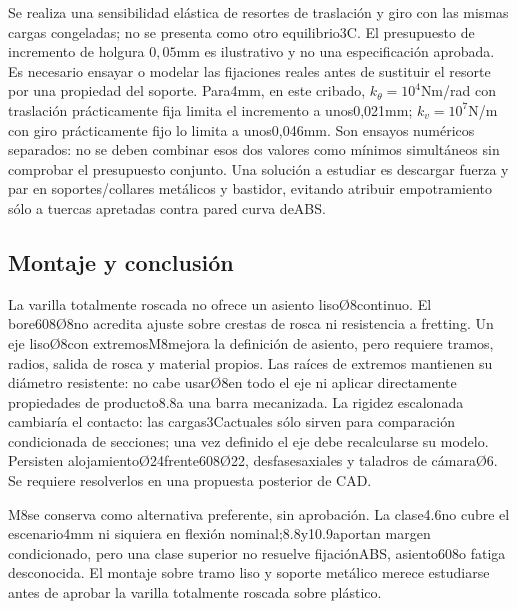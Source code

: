 Se realiza una sensibilidad elástica de resortes de traslación y giro con las mismas cargas
congeladas; no se presenta como otro equilibrio3C. El presupuesto de incremento de holgura
$0,05$mm es ilustrativo y no una especificación aprobada. Es necesario ensayar o modelar
las fijaciones reales antes de sustituir el resorte por una propiedad del soporte.
Para4mm, en este cribado, $k_\theta=10^4$Nm/rad con traslación prácticamente fija
limita el incremento a unos0,021mm; $k_v=10^7$N/m con giro prácticamente fijo
lo limita a unos0,046mm. Son ensayos numéricos separados: no se deben combinar
esos dos valores como mínimos simultáneos sin comprobar el presupuesto conjunto.
Una solución a estudiar es descargar fuerza y par en soportes/collares metálicos y bastidor,
evitando atribuir empotramiento sólo a tuercas apretadas contra pared curva deABS.

\subsection{Montaje y conclusión}
La varilla totalmente roscada no ofrece un asiento lisoØ8continuo. El bore608Ø8no acredita
ajuste sobre crestas de rosca ni resistencia a fretting. Un eje lisoØ8con extremosM8mejora
la definición de asiento, pero requiere tramos, radios, salida de rosca y material propios.
Las raíces de extremos mantienen su diámetro resistente: no cabe usarØ8en todo el eje ni
aplicar directamente propiedades de producto8.8a una barra mecanizada.
La rigidez escalonada cambiaría el contacto: las cargas3Cactuales sólo sirven para comparación
condicionada de secciones; una vez definido el eje debe recalcularse su modelo.
Persisten alojamientoØ24frente608Ø22, desfasesaxiales y taladros de cámaraØ6.
Se requiere resolverlos en una propuesta posterior de CAD.

M8se conserva como alternativa preferente, sin aprobación. La clase4.6no cubre el escenario4mm
ni siquiera en flexión nominal;8.8y10.9aportan margen condicionado, pero una clase superior
no resuelve fijaciónABS, asiento608o fatiga desconocida. El montaje sobre tramo liso y
soporte metálico merece estudiarse antes de aprobar la varilla totalmente roscada sobre plástico.
